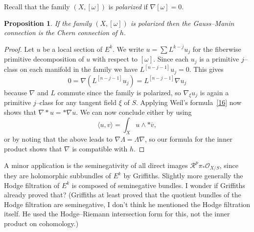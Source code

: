 \documentclass[11pt,a4paper]{amsart}
\def\^#1{^{[#1]}}
\def\RR{\mathcal{R}}
\def\OO{\mathcal{O}}
\newtheorem{prop}[theo]{Proposition}
\theoremstyle{definition}
\theoremstyle{remark}
\numberwithin{equation}{section}
\begin{document}
Recall that the family $(X,[\omega])$ is \emph{polarized} if $\nabla
[\omega] = 0$.


\begin{prop}
    If the family $(X,[\omega])$ is polarized then the Gauss--Manin
connection is the Chern connection of $h$.
\end{prop}


\begin{proof}
Let $u$ be a local section of $E^{k}$. We write $u = \sum L^{k-j}u_j$ for
the fiberwise primitive decomposition of $u$ with respect to $[\omega]$. 
Since each $u_j$ is a primitive $j$--class on each manifold in the family
we have $L\^{n-j-1} u_j = 0$. This gives
$$
0 = \nabla(L\^{n-j-1} u_j) =  L\^{n-j-1} \nabla u_j
$$
because $\nabla$ and $L$ commute since the family is polarized, so
$\nabla_\xi u_j$ is again a primitive $j$--class for any tangent field
$\xi$ of $S$. Applying Weil's formula~\ref{16} now shows that 
$\nabla\!\! *\! u = * \nabla u$. We can now conclude either by using 
$$
\langle u, v \rangle = \int_X  u \wedge * \overline v,
$$
or by noting that the above leads to $\nabla \Lambda = \Lambda \nabla$,
so our formula for the inner product shows that $\nabla$ is compatible
with $h$.
\end{proof}


A minor application is the seminegativity of all direct images
$\RR^{p}\pi_* \OO_{X/S}$, since they are holomorphic subbundles of $E^k$
by Griffiths. Slightly more generally the Hodge filtration of $E^{k}$ is
composed of seminegative bundles. I wonder if Griffiths already proved
that? (Griffiths at least proved that the quotient bundles of the Hodge
filtration are seminegative, I don't think he mentioned the Hodge
filtration itself. He used the Hodge--Riemann intersection form for this,
not the inner product on cohomology.)




\end{document}

